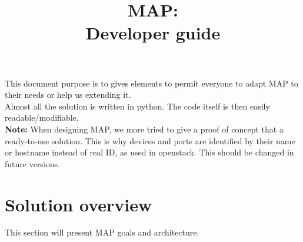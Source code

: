 



\title{MAP:\\Developer guide}
\maketitle

\tableofcontents
\newpage

This document purpose is to gives elements to permit everyone to adapt MAP to
their needs or help us extending it.\\
Almost all the solution is written in python. The code itself is then easily
readable/modifiable.\\[1\baselineskip]
\textbf{Note:} When designing MAP, we more tried to give a proof of concept that a ready-to-use solution. This is why devices and ports are identified by their name or hostname instead of real ID, as used in openstack. This should be changed in future versions.

\section{Solution overview}
This section will present MAP goals and architecture.

